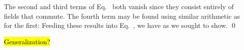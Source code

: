 {	The second and third terms of Eq.~ both vanish since they consist entirely of fields that commute.  The fourth term may be found using similar arithmetic as for the first:
	Feeding these results into Eq.~, we have
	as we sought to show. \qed
	
	\hl{Generalization?}
}